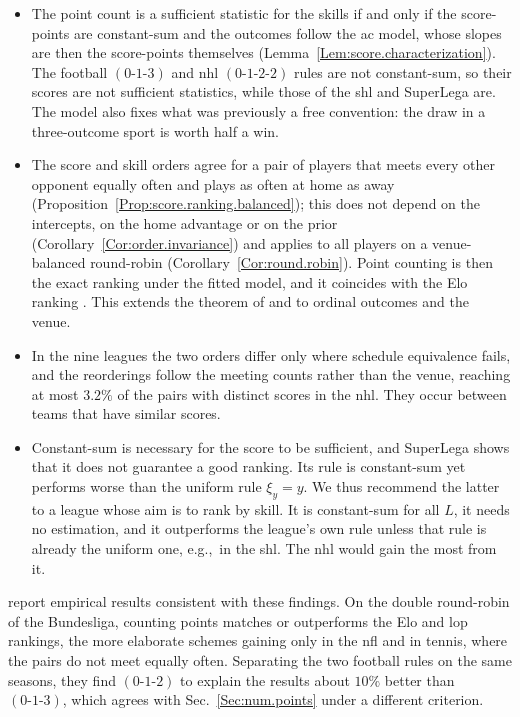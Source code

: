 \documentclass[letterpaper,12pt]{article}
\newcommand{\eg}{e.g.,~}	%
\begin{document}
\begin{itemize}
\item The point count is a sufficient statistic for the skills if and only if the score-points are constant-sum and the outcomes follow the \gls{ac} model, whose slopes are then the score-points themselves (Lemma~\ref{Lem:score.characterization}). The football $(0\text{-}1\text{-}3)$ and \gls{nhl} $(0\text{-}1\text{-}2\text{-}2)$ rules are not constant-sum, so their scores are not sufficient statistics, while those of the \gls{shl} and SuperLega are. The model also fixes what was previously a free convention: the draw in a three-outcome sport is worth half a win.

\item The score and skill orders agree for a pair of players that meets every other opponent equally often and plays as often at home as away (Proposition~\ref{Prop:score.ranking.balanced}); this does not depend on the intercepts, on the home advantage or on the prior (Corollary~\ref{Cor:order.invariance}) and applies to all players on a venue-balanced round-robin (Corollary~\ref{Cor:round.robin}). Point counting is then the exact ranking under the fitted model, and it coincides with the Elo ranking \citep{Szczecinski26b}. This extends the theorem of \citet{Zermelo29} and \citet{Ford57} to ordinal outcomes and the venue.

\item In the nine leagues the two orders differ only where schedule equivalence fails, and the reorderings follow the meeting counts rather than the venue, reaching at most $3.2\%$ of the pairs with distinct scores in the \gls{nhl}. They occur between teams that have similar scores.

\item Constant-sum is necessary for the score to be sufficient, and SuperLega shows that it does not guarantee a good ranking. Its rule is constant-sum yet performs worse than the uniform rule $\xi_y=y$. We thus recommend the latter to a league whose aim is to rank by skill. It is constant-sum for all $L$, it needs no estimation, and it outperforms the league's own rule unless that rule is already the uniform one, \eg in the \gls{shl}. The \gls{nhl} would gain the most from it.

\end{itemize}

\citet{Tiwisina19} report empirical results consistent with these findings. On the double round-robin of the Bundesliga, counting points matches or outperforms the Elo and \gls{lop} rankings, the more elaborate schemes gaining only in the \gls{nfl} and in tennis, where the pairs do not meet equally often. Separating the two football rules on the same seasons, they find $(0\text{-}1\text{-}2)$ to explain the results about $10\%$ better than $(0\text{-}1\text{-}3)$, which agrees with Sec.~\ref{Sec:num.points} under a different criterion.
\end{document}
